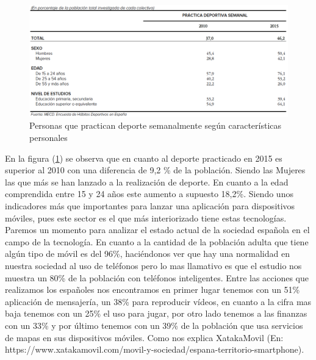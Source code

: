 \documentclass[a4paper, 11pt]{article}
\begin{document}
      \begin{figure}[H]
          \centering
          \includegraphics[width=1\textwidth]{Personas-que-practican-deporte-semanalmente-segun-caracteristicas-personales}
          \caption{Personas que practican deporte semanalmente según características personales}
          \label{f:personas}
      \end{figure}

      En la figura (\ref{f:personas}) se observa que en cuanto al deporte
      practicado en 2015 es superior al 2010 con una diferencia de 9,2 \% de la
      población. Siendo las Mujeres las que más se han lanzado a la realización
      de deporte. En cuanto a la edad comprendida entre 15 y 24 años este aumento
      a supuesto 18,2\%. Siendo unos indicadores más que importantes para lanzar
      una aplicación para dispositivos móviles, pues este sector es el que más
      interiorizado tiene estas tecnologías.\\

      Paremos un momento para analizar el estado actual de la sociedad española
      en el campo de la tecnología. En cuanto a la cantidad de la población adulta
      que tiene algún tipo de móvil es del 96\%, haciéndonos ver que hay una
      normalidad en nuestra sociedad al uso de teléfonos pero lo mas llamativo
      es que el estudio nos muestra un 80\% de la población con teléfonos
      inteligentes. Entre las acciones que realizamos los españoles nos
      encontramos en primer lugar tenemos con un 51\% aplicación de mensajería,
      un 38\% para reproducir vídeos, en cuanto a la cifra mas baja tenemos con
      un 25\% el uso para jugar, por otro lado tenemos a las finanzas con un
      33\% y por último tenemos con un 39\% de la población que usa servicios de
      mapas en sus dispositivos móviles. Como nos explica XatakaMovil (En:
      https://www.xatakamovil.com/movil-y-sociedad/espana-territorio-smartphone).\\
\end{document}
